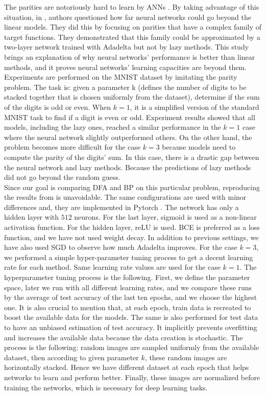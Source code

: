 \documentclass[a4paper, nobind]{templates/ociamthesis}
\begin{document}
The parities are notoriously hard to learn by ANNs \cite{DBLP:journals/corr/abs-1807-06399}. By taking advantage of this situation, in \cite{DBLP:journals/corr/abs-2002-07400}, authors questioned how far neural networks could go beyond the linear models. They did this by focusing on parities that have a complex family of target functions. They demonstrated that this family could be approximated by a two-layer network trained with Adadelta but not by lazy methods. This study brings an explanation of why neural networks' performance is better than linear methods, and it proves neural networks' learning capacities are beyond them.\\
Experiments are performed on the MNIST dataset by imitating the parity problem. The task is: given a parameter k (defines the number of digits to be stacked together that is chosen uniformly from the dataset), determine if the sum of the digits is odd or even. When \(k=1\), it is a simplified version of the standard MNIST task to find if a digit is even or odd. Experiment results showed that all models, including the lazy ones, reached a similar performance in the \(k=1\) case where the neural network slightly outperformed others. On the other hand, the problem becomes more difficult for the case \(k=3\) because models need to compute the parity of the digits' sum. In this case, there is a drastic gap between the neural network and lazy methods. Because the predictions of lazy methods did not go beyond the random guess.\\
Since our goal is comparing DFA and BP on this particular problem, reproducing the results from \cite{DBLP:journals/corr/abs-2002-07400} is unavoidable. The same configurations are used with minor differences and, they are implemented in Pytorch \cite{NEURIPS2019_9015}. The network has only a hidden layer with \(512\) neurons. For the last layer, sigmoid is used as a non-linear activation function. For the hidden layer, reLU is used. BCE is preferred as a loss function, and we have not used weight decay. In addition to previous settings, we have also used SGD to observe how much Adadelta improves. For the case \(k=3\), we performed a simple hyper-parameter tuning process to get a decent learning rate for each method. Same learning rate values are used for the case \(k=1\). The hyperparameter tuning process is the following. First, we define the parameter space, later we run with all different learning rates, and we compare these runs by the average of test accuracy of the last ten epochs, and we choose the highest one. It is also crucial to mention that, at each epoch, train data is recreated to boost the available data for the models. The same is also performed for test data to have an unbiased estimation of test accuracy. It implicitly prevents overfitting and increases the available data because the data creation is stochastic. The process is the following: random images are sampled uniformly from the available dataset, then according to given parameter \(k\), these random images are horizontally stacked. Hence we have different dataset at each epoch that helps networks to learn and perform better. Finally, these images are normalized before training the networks, which is necessary for deep learning tasks.
\end{document}
